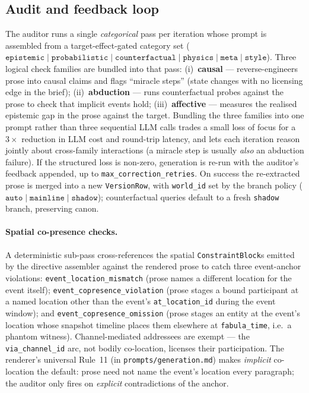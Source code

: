 \documentclass[11pt]{article}
\begin{document}
\subsection{Audit and feedback loop}
\label{app:audit}

The auditor \citep[an LLM-as-judge in the sense of][]{gu2024judge}
runs a single \emph{categorical} pass per iteration whose prompt
is assembled from a target-effect-gated category set
($\texttt{epistemic} \mid \texttt{probabilistic} \mid
\texttt{counterfactual} \mid \texttt{physics} \mid \texttt{meta}
\mid \texttt{style}$). Three logical check families are bundled
into that pass: (i)~\textbf{causal} --- reverse-engineers prose
into causal claims and flags ``miracle steps'' (state changes
with no licensing edge in the brief); (ii)~\textbf{abduction}
--- runs counterfactual probes against the prose to check that
implicit events hold; (iii)~\textbf{affective} --- measures the
realised epistemic gap in the prose against the target. Bundling
the three families into one prompt rather than three sequential
LLM calls trades a small loss of focus for a $3\times$ reduction
in LLM cost and round-trip latency, and lets each iteration
reason jointly about cross-family interactions (a miracle step is
usually \emph{also} an abduction failure). If the structured
loss is non-zero, generation is re-run with the auditor's
feedback appended, up to \texttt{max\_correction\_retries}. On
success the re-extracted prose is merged into a new
\texttt{VersionRow}, with \texttt{world\_id} set by the branch
policy ($\texttt{auto} \mid \texttt{mainline} \mid
\texttt{shadow}$); counterfactual queries default to a fresh
\texttt{shadow} branch, preserving canon.

\paragraph{Spatial co-presence checks.} A deterministic
sub-pass cross-references the spatial \texttt{ConstraintBlock}s
emitted by the directive assembler against the rendered prose to
catch three event-anchor violations: \texttt{event\_location\_mismatch}
(prose names a different location for the event itself);
\texttt{event\_copresence\_violation} (prose stages a bound
participant at a named location other than the event's
\texttt{at\_location\_id} during the event window); and
\texttt{event\_copresence\_omission} (prose stages an entity at
the event's location whose snapshot timeline places them
elsewhere at \texttt{fabula\_time}, i.e.\ a phantom witness).
Channel-mediated addressees are exempt --- the
\texttt{via\_channel\_id} arc, not bodily co-location, licenses
their participation. The renderer's universal Rule~11 (in
\texttt{prompts/generation.md}) makes \emph{implicit} co-location
the default: prose need not name the event's location every
paragraph; the auditor only fires on \emph{explicit}
contradictions of the anchor.
\end{document}
